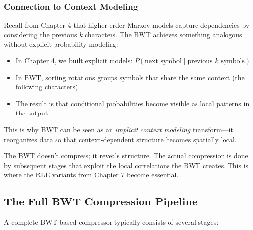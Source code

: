 \subsubsection{Connection to Context Modeling}

Recall from Chapter 4 that higher-order Markov models capture dependencies by considering the previous \(k\) characters. The BWT achieves something analogous without explicit probability modeling:

\begin{itemize}
    \item In Chapter 4, we built explicit models: \(P(\text{next symbol} \mid \text{previous } k \text{ symbols})\)
    \item In BWT, sorting rotations groups symbols that share the same context (the following characters)
    \item The result is that conditional probabilities become visible as local patterns in the output
\end{itemize}

This is why BWT can be seen as an \emph{implicit context modeling} transform—it reorganizes data so that context-dependent structure becomes spatially local.

\begin{importantbox}
The BWT doesn't compress; it reveals structure. The actual compression is done by subsequent stages that exploit the local correlations the BWT creates. This is where the RLE variants from Chapter 7 become essential.
\end{importantbox}

\subsection{The Full BWT Compression Pipeline}

A complete BWT-based compressor typically consists of several stages:

\begin{center}
\end{center}


